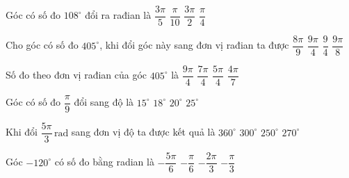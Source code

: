 \begin{ex}%
	Góc có số đo $108^\circ$ đổi ra rađian là 
	\choice 
		{\True $\dfrac{3\pi}{5}$} 
		 {$\dfrac{\pi}{10}$}
		{$\dfrac{3\pi}{2}$} 
		 {$\dfrac{\pi}{4}$}
\end{ex}

\begin{ex}%
	Cho góc có số đo $405^\circ$, khi đổi góc này sang đơn vị rađian  ta được
	\choice 
		 {$\dfrac{8\pi}{9}$}
		 {\True $\dfrac{9\pi}{4}$}
		{$\dfrac{9}{4}$} 
		{$\dfrac{9\pi}{8}$} 
\end{ex}

\begin{ex}%
	Số  đo theo đơn vị rađian của góc $405^\circ$ là
	\choice 
		{\True $\dfrac{9\pi}{4}$} 
		{$\dfrac{7\pi}{4}$} 
		 {$\dfrac{5\pi}{4}$}
		 {$\dfrac{4\pi}{7}$}
\end{ex}

\begin{ex}%
	Góc có số đo  $\dfrac{\pi}{9}$ đổi sang độ là
	 \choice
		 {$15^{\circ}$}
		 {$18^{\circ}$}
		{\True  $20^{\circ}$}
		 {$25^{\circ}$}
\end{ex}

\begin{ex}%
	Khi đổi $\dfrac{5\pi }{3}\,\mathrm{rad}$ sang đơn vị  độ ta được kết quả là
	\choice 
		{$360^\circ$} 
		{\True  $300^\circ$}
		{$250^\circ$} 
		{$270^\circ$} 
\end{ex}

\begin{ex}%
	Góc $-120^\circ$ có số đo  bằng radian là
	\choice 
		{$-\dfrac{5\pi}{6}$} 
		 {$-\dfrac{\pi}{6}$}
		 {\True $-\dfrac{2\pi}{3}$}
		{$-\dfrac{\pi}{3}$} 
\end{ex}

